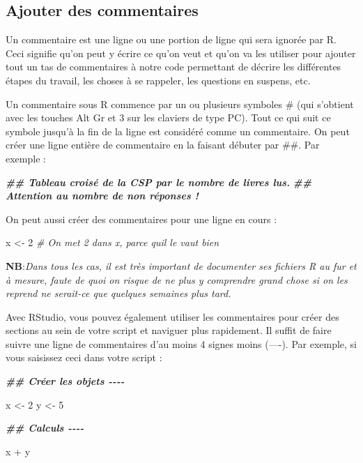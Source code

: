 \documentclass[
]{book}
\newenvironment{Shaded}{\begin{snugshade}}{\end{snugshade}}
\newcommand{\CommentTok}[1]{\textcolor[rgb]{0.56,0.35,0.01}{\textit{#1}}}
\newcommand{\DecValTok}[1]{\textcolor[rgb]{0.00,0.00,0.81}{#1}}
\newcommand{\DocumentationTok}[1]{\textcolor[rgb]{0.56,0.35,0.01}{\textbf{\textit{#1}}}}
\newcommand{\NormalTok}[1]{#1}
\newcommand{\OtherTok}[1]{\textcolor[rgb]{0.56,0.35,0.01}{#1}}
\newcommand{\SpecialCharTok}[1]{\textcolor[rgb]{0.00,0.00,0.00}{#1}}
\begin{document}
\hypertarget{ajouter-des-commentaires}{%
\subsection{Ajouter des commentaires}\label{ajouter-des-commentaires}}

Un commentaire est une ligne ou une portion de ligne qui sera ignorée par R. Ceci signifie qu'on peut y écrire ce qu'on veut et qu'on va les utiliser pour ajouter tout un tas de commentaires à notre code permettant de décrire les différentes étapes du travail, les choses à se rappeler, les questions en suspens, etc.

Un commentaire sous R commence par un ou plusieurs symboles \# (qui s'obtient avec les touches Alt Gr et 3 sur les claviers de type PC). Tout ce qui suit ce symbole jusqu'à la fin de la ligne est considéré comme un commentaire. On peut créer une ligne entière de commentaire en la faisant débuter par \#\#. Par exemple :

\begin{Shaded}
\begin{Highlighting}[]
\DocumentationTok{\#\# Tableau croisé de la CSP par le nombre de livres lus.}
\DocumentationTok{\#\# Attention au nombre de non réponses !}
\end{Highlighting}
\end{Shaded}

On peut aussi créer des commentaires pour une ligne en cours :

\begin{Shaded}
\begin{Highlighting}[]
\NormalTok{x }\OtherTok{\textless{}{-}} \DecValTok{2} \CommentTok{\# On met 2 dans x, parce qu\textquotesingle{}il le vaut bien}
\end{Highlighting}
\end{Shaded}

\textbf{NB}:\emph{Dans tous les cas, il est très important de documenter ses fichiers R au fur et à mesure, faute de quoi on risque de ne plus y comprendre grand chose si on les reprend ne serait-ce que quelques semaines plus tard.}

Avec RStudio, vous pouvez également utiliser les commentaires pour créer des sections au sein de votre script et naviguer plus rapidement. Il suffit de faire suivre une ligne de commentaires d'au moins 4 signes moins (----). Par exemple, si vous saisissez ceci dans votre script :

\begin{Shaded}
\begin{Highlighting}[]
\DocumentationTok{\#\# Créer les objets {-}{-}{-}{-}}

\NormalTok{x }\OtherTok{\textless{}{-}} \DecValTok{2}
\NormalTok{y }\OtherTok{\textless{}{-}} \DecValTok{5}

\DocumentationTok{\#\# Calculs {-}{-}{-}{-}}

\NormalTok{x }\SpecialCharTok{+}\NormalTok{ y}
\end{Highlighting}
\end{Shaded}
\end{document}
